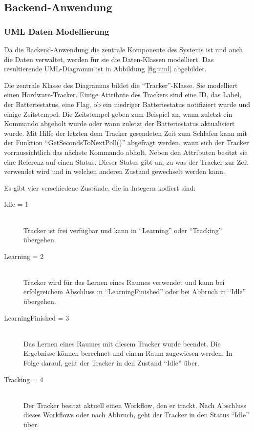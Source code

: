 
\subsection{Backend-Anwendung} \label{sec:backend}

\subsubsection{UML Daten Modellierung}
Da die Backend-Anwendung die zentrale Komponente des Systems ist und auch die Daten verwaltet, werden für sie die Daten-Klassen modelliert.
Das resultierende UML-Diagramm ist in Abbildung \ref{fig:uml} abgebildet.

Die zentrale Klasse des Diagramms bildet die \enquote{Tracker}-Klasse.
Sie modelliert einen Hardware-Tracker.
Einige Attribute des Trackers sind eine ID, das Label, der Batteriestatus, eine Flag, ob ein niedriger Batteriestatus notifiziert wurde
und einige Zeitstempel.
Die Zeitstempel geben zum Beispiel an, wann zuletzt ein Kommando abgeholt wurde oder wann zuletzt der Batteriestatus aktualisiert wurde.
Mit Hilfe der letzten dem Tracker gesendeten Zeit zum Schlafen kann mit der Funktion \enquote{GetSecondsToNextPoll()} abgefragt werden,
wann sich der Tracker vorraussichtlich das nächste Kommando abholt.
Neben den Attributen besitzt sie eine Referenz auf einen Status.
Dieser Status gibt an, zu was der Tracker zur Zeit verwendet wird und in welchen anderen Zustand gewechselt werden kann.

Es gibt vier verschiedene Zustände, die in Integern kodiert sind:
\begin{description}
	\item[Idle = 1] \hfill \\
		Tracker ist frei verfügbar und kann in \enquote{Learning} oder \enquote{Tracking} übergehen.
	\item[Learning = 2] \hfill \\
		Tracker wird für das Lernen eines Raumes verwendet und kann bei erfolgreichem Abschluss in \enquote{LearningFinished} oder bei Abbruch in \enquote{Idle} übergehen.
	\item[LearningFinished = 3] \hfill \\
		Das Lernen eines Raumes mit diesem Tracker wurde beendet. Die Ergebnisse können berechnet und einem Raum zugewiesen werden. In Folge darauf, geht der Tracker in den Zustand \enquote{Idle} über.
	\item[Tracking = 4] \hfill \\
		Der Tracker besitzt aktuell einen Workflow, den er trackt. Nach Abschluss dieses Workflows oder nach Abbruch, geht der Tracker in den Status \enquote{Idle} über.
\end{description}

